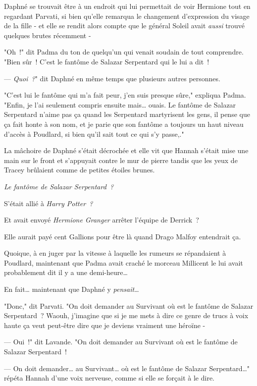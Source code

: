 Daphné se trouvait être à un endroit qui lui permettait de voir Hermione tout en regardant Parvati, si bien qu'elle remarqua le changement d'expression du visage de la fille - et elle se rendit alors compte que le général Soleil avait \emph{aussi} trouvé quelques brutes récemment -

"Oh~!" dit Padma du ton de quelqu'un qui venait soudain de tout comprendre. "Bien sûr~! C'est le fantôme de Salazar Serpentard qui le lui a dit~!

--- \emph{Quoi~?}" dit Daphné en même temps que plusieurs autres personnes.

"C'est lui le fantôme qui m'a fait peur, j'en suis presque sûre," expliqua Padma. "Enfin, je l'ai seulement compris ensuite mais… ouais. Le fantôme de Salazar Serpentard n'aime pas ça quand les Serpentard martyrisent les gens, il pense que ça fait honte à son nom, et je parie que son fantôme a toujours un haut niveau d'accès à Poudlard, si bien qu'il sait tout ce qui s'y passe,."

La mâchoire de Daphné s'était décrochée et elle vit que Hannah s'était mise une main sur le front et s'appuyait contre le mur de pierre tandis que les yeux de Tracey brûlaient comme de petites étoiles brunes.

\emph{Le fantôme de Salazar Serpentard~?}

S'était allié à \emph{Harry Potter~?}

Et avait envoyé \emph{Hermione Granger} arrêter l'équipe de Derrick~?

Elle aurait payé cent Gallions pour être là quand Drago Malfoy entendrait ça.

Quoique, à en juger par la vitesse à laquelle les rumeurs se répandaient à Poudlard, maintenant que Padma avait craché le morceau Millicent le lui avait probablement dit il y a une demi-heure…

En fait… maintenant que Daphné y \emph{pensait}…

"Donc," dit Parvati. "On doit demander au Survivant où est le fantôme de Salazar Serpentard~? Waouh, j'imagine que si je me mets à dire ce genre de trucs à voix haute ça veut peut-être dire que je deviens vraiment une héroïne -

--- Oui~!" dit Lavande. "On doit demander au Survivant où est le fantôme de Salazar Serpentard~!

--- On doit demander… au Survivant… où est le fantôme de Salazar Serpentard…" répéta Hannah d'une voix nerveuse, comme si elle se forçait à le dire.

